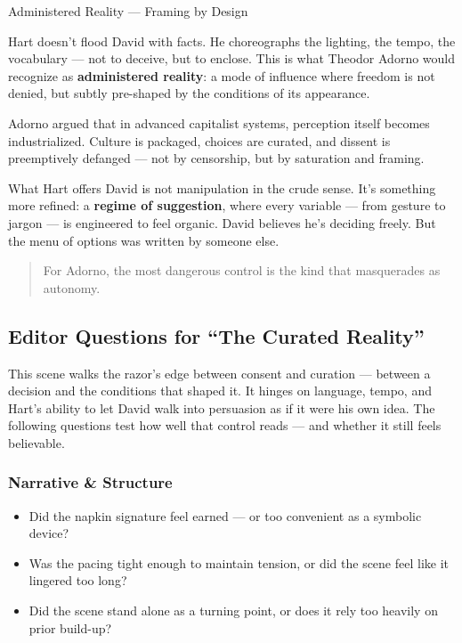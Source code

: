 \begin{PsychologicalSidebar}{Administered Reality --- Framing by Design}

    Hart doesn’t flood David with facts. He choreographs the lighting, the tempo, the vocabulary — not to deceive, 
    but to enclose. This is what Theodor Adorno would recognize as \textbf{administered reality}:  
    a mode of influence where freedom is not denied, but subtly pre-shaped by the conditions of its appearance.
    
    \medskip
    
    Adorno argued that in advanced capitalist systems, perception itself becomes industrialized. Culture is packaged, 
    choices are curated, and dissent is preemptively defanged — not by censorship, but by saturation and framing.
    
    \medskip
    
    What Hart offers David is not manipulation in the crude sense. It’s something more refined:  
    a \textbf{regime of suggestion}, where every variable --- from gesture to jargon --- is engineered to feel organic.  
    David believes he’s deciding freely. But the menu of options was written by someone else.
    
    \begin{quote}
    For Adorno, the most dangerous control  
    is the kind that masquerades as autonomy.
    \end{quote}
    
\end{PsychologicalSidebar}


\subsection*{Editor Questions for ``The Curated Reality''}

    This scene walks the razor's edge between consent and curation — between a decision and the conditions that shaped it. It hinges on language, tempo, and Hart’s ability to let David walk into persuasion as if it were his own idea. The following questions test how well that control reads — and whether it still feels believable.
    
    \subsubsection*{Narrative \& Structure}
    
    \begin{itemize}
      \item Did the napkin signature feel earned — or too convenient as a symbolic device?
      \item Was the pacing tight enough to maintain tension, or did the scene feel like it lingered too long?
      \item Did the scene stand alone as a turning point, or does it rely too heavily on prior build-up?
    \end{itemize}
    
